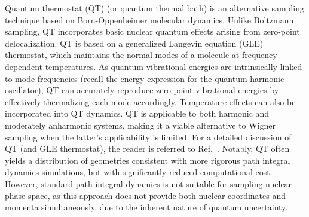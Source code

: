 \documentclass[9pt,bestpractices,pubversion]{livecoms}
\begin{document}
Quantum thermostat (QT) \cite{ceriotti2009nuclear,ceriotti2010colored,Finocchi2022} (or quantum thermal bath) is an alternative sampling technique based on Born-Oppenheimer molecular dynamics. Unlike Boltzmann sampling, QT incorporates basic nuclear quantum effects arising from zero-point delocalization. QT is based on a generalized Langevin equation (GLE) thermostat, which maintains the normal modes of a molecule at frequency-dependent temperatures. As quantum vibrational energies are intrinsically linked to mode frequencies (recall the energy expression for the quantum harmonic oscillator), QT can accurately reproduce zero-point vibrational energies by effectively thermalizing each mode accordingly. Temperature effects can also be incorporated into QT dynamics. QT is applicable to both harmonic and moderately anharmonic systems\cite{suchan2018importance,Vuilleumier2013}, making it a viable alternative to Wigner sampling when the latter’s applicability is limited. For a detailed discussion of QT (and GLE thermostat), the reader is referred to Ref.~. Notably, QT often yields a distribution of geometries consistent with more rigorous path integral dynamics simulations, but with significantly reduced computational cost.\cite{prlj2023deciphering} However, standard path integral dynamics is not suitable for sampling nuclear phase space, as this approach does not provide both nuclear coordinates and momenta simultaneously, due to the inherent nature of quantum uncertainty.
\end{document}
